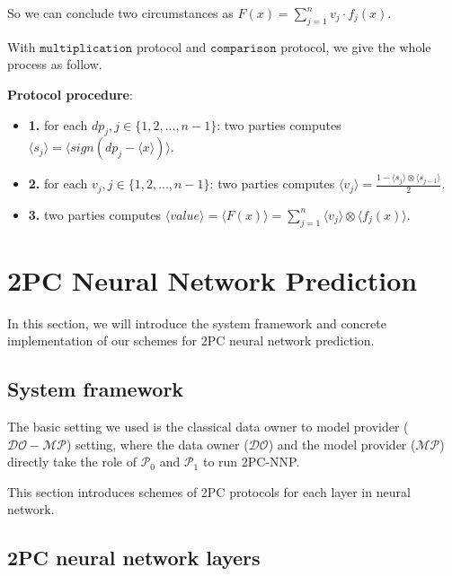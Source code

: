 \documentclass[letterpaper]{article} %
\begin{document}
       So we can conclude two circumstances as $F(x)=\sum_{j=1}^{n}v_{j}\cdot f_{j}(x)$.

       With $\mathtt{multiplication}$ protocol and $\mathtt{comparison}$ protocol, we give the whole process as follow.%


       \textbf{Protocol procedure}:

       \begin{itemize}
           \item \textbf{1.}
           for each $dp_{j},j\in\{1,2,...,n-1\}$:
           two parties computes $\langle s_{j}\rangle=\langle sign(dp_{j}-\langle x\rangle)\rangle$.

           \item \textbf{2.}
           for each $v_{j},j\in\{1,2,...,n-1\}$:
           two parties computes $\langle v_{j} \rangle= \frac{1-\langle s_{j}\rangle\otimes \langle s_{j-1}\rangle}{2}$.

           \item \textbf{3.}
           two parties computes $\langle value\rangle=\langle F(x)\rangle=\sum_{j=1}^{n}\langle v_{j}\rangle\otimes \langle f_{j}(x)\rangle$.
       \end{itemize}


    \section{2PC Neural Network Prediction}
       In this section, we will introduce the system framework and concrete implementation of our
       schemes for 2PC neural network prediction.

    \subsection{System framework}
       The basic setting we used is the classical data owner to model provider ($\mathcal{DO}-\mathcal{MP}$) setting,
       where the data owner ($\mathcal{DO}$) and the model provider ($\mathcal{MP}$)
       directly take the role of $\mathcal{P}_{0}$ and $\mathcal{P}_{1}$ to run 2PC-NNP.

       This section introduces schemes
       of 2PC protocols for each layer in neural network.


    \subsection{2PC neural network layers}
\end{document}
